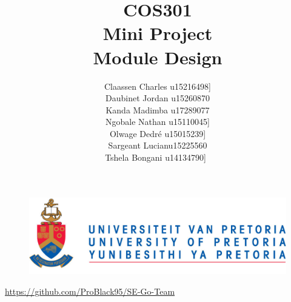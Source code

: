 \documentclass[12pt]{article}
\begin{document}
	

	\begin{figure}
		\includegraphics[width=\linewidth]{logo.jpg}	
	\end{figure}

	\title 	{
				COS301\\
				Mini Project\\
				Module Design
		   	}
	\author {
				Claassen Charles u15216498]\\
                Daubinet Jordan u15260870\\
                Kanda Madimba u17289077\\
                Ngobale Nathan u15110045]\\
                Olwage Dedré u15015239]\\
                Sargeant Lucianu15225560\\
                Tshela Bongani u14134790]\
			}
	\maketitle
	\begin{center}
			\url{https://github.com/ProBlack95/SE-Go-Team}	
	\end{center}
	\newpage
	\tableofcontents
	
	\newpage
	
\end{document}
